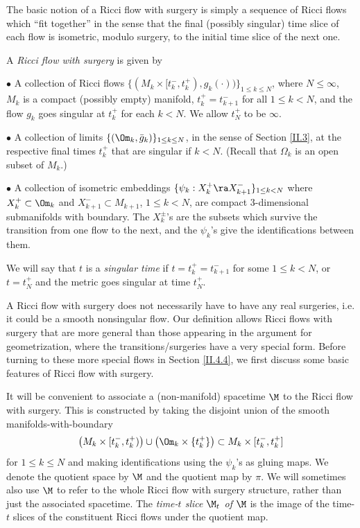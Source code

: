 The basic notion of a Ricci flow with surgery is simply a sequence of
Ricci flows which ``fit together'' in the sense that the final
(possibly singular) time slice
of each flow is isometric, modulo surgery, to the initial time slice
of the next one.
\begin{definition}
  \label{def:kl-ricci-flow-surgery-general-setting-ricci-flow-surgery-definition}
   \label{flowwithsurgery}
A {\em Ricci flow with surgery} is given by

$\bullet$   A collection of Ricci flows
$\{(M_k\times[t_k^-,t_k^+),g_k(\cdot))\}_{1\leq k \leq N}$,
where $N\leq \infty$, $M_k$ is a compact (possibly empty) manifold,
$t_k^+=t_{k+1}^-$ for  all
$1\leq k<N$, and the flow $g_k$
goes singular at $t_k^+$
for each $k < N$. We allow $t_N^+$ to be $\infty$.

$\bullet$ A collection of limits
$\{(\Om_k,\bar g_k)\}_{1\leq k\leq N}$, in the sense of Section \ref{II.3},
at the respective final times $t_k^+$ that are
singular if $k < N$. (Recall that
$\Omega_k$ is an open subset of
$M_k$.)

$\bullet$ A collection of isometric embeddings
$\{\psi_k:X_k^+\ra X_{k+1}^-\}_{1\leq k<N}$
where $X_k^+\subset \Om_k$ and $X_{k+1}^-\subset M_{k+1}$,
$1 \le k< N$, are compact $3$-dimensional submanifolds with
boundary.   The $X_k^\pm$'s are the subsets which survive the
transition from one flow to the next, and the $\psi_k$'s give
the identifications between them.

We will say that $t$ is a {\em singular time} if $t=t_k^+=t_{k+1}^-$
for some $1\leq k<N$, or $t=t_N^+$ and the metric goes singular
at time $t_N^+$.
\end{definition}

A Ricci flow with surgery does not necessarily have to have any
real surgeries, i.e. it could be a smooth nonsingular flow.
Our definition allows Ricci flows with surgery that are more
general than those appearing in the argument for geometrization,
where the transitions/surgeries have a very special form.  Before
turning to these more special flows in Section \ref{II.4.4},
we first discuss some
basic features of Ricci flow with surgery.

It will be convenient to associate a (non-manifold) spacetime $\M$ to
the Ricci flow with surgery.  This is constructed by taking the disjoint union
of  the smooth manifolds-with-boundary
\begin{equation}
\left(M_k\times [t_k^-,t_k^+)\right)\cup \left(\Om_k\times\{t_k^+\}\right)
\subset M_k\times [t_k^-,t_k^+]
\end{equation}
 for $1\leq k\leq N$
and making identifications using the $\psi_k$'s as gluing
maps.   We denote the quotient space by $\M$ and the quotient map
by $\pi$.  We will sometimes also use $\M$ to refer to the
whole Ricci flow with surgery structure,
rather than just the associated spacetime.
The {\em time-$t$ slice $\M_t$ of $\M$} is the image
of the time-$t$ slices of the constituent Ricci
flows under the quotient map.

